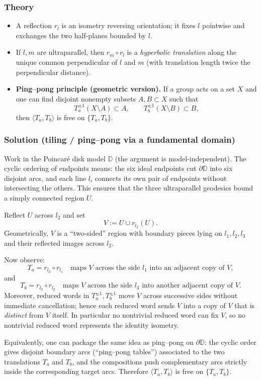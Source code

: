 \documentclass[12pt,a4paper]{article}
\newcommand{\DD}{\mathbb{D}}
\theoremstyle{plain}
\theoremstyle{definition}      %
\begin{document}
\subsubsection*{Theory}
\begin{itemize}
	\item A reflection $r_l$ is an isometry reversing orientation; it fixes $l$ pointwise and exchanges the two half-planes bounded by $l$.
	\item If $l,m$ are ultraparallel, then $r_m\circ r_l$ is a \emph{hyperbolic translation} along the unique common perpendicular of $l$ and $m$
	(with translation length twice the perpendicular distance).
	\item \textbf{Ping--pong principle (geometric version).}
	If a group acts on a set $X$ and one can find disjoint nonempty subsets $A,B\subset X$ such that
	\[
	T_a^{\pm1}(X\setminus A)\subset A,
	\qquad
	T_b^{\pm1}(X\setminus B)\subset B,
	\]
	then $\langle T_a,T_b\rangle$ is free on $\{T_a,T_b\}$.
\end{itemize}

\subsubsection*{Solution (tiling / ping--pong via a fundamental domain)}
Work in the Poincar\'e disk model $\DD$ (the argument is model-independent).
The cyclic ordering of endpoints means: the six ideal endpoints cut $\partial\DD$ into six disjoint arcs, and each line $l_i$
connects its own pair of endpoints without intersecting the others. This ensures that the three ultraparallel geodesics bound a
simply connected region $U$.

Reflect $U$ across $l_2$ and set
\[
V:=U\cup r_{l_2}(U).
\]
Geometrically, $V$ is a ``two-sided'' region with boundary pieces lying on $l_1,l_2,l_3$ and their reflected images across $l_2$.

Now observe:
\[
T_a=r_{l_2}\circ r_{l_1}\quad\text{maps $V$ across the side $l_1$ into an adjacent copy of $V$},
\]
and
\[
T_b=r_{l_3}\circ r_{l_2}\quad\text{maps $V$ across the side $l_3$ into another adjacent copy of $V$}.
\]
Moreover, reduced words in $T_a^{\pm1},T_b^{\pm1}$ move $V$ across successive sides without immediate cancellation; hence each reduced word
sends $V$ into a copy of $V$ that is \emph{distinct} from $V$ itself. In particular no nontrivial reduced word can fix $V$, so
no nontrivial reduced word represents the identity isometry.

Equivalently, one can package the same idea as ping--pong on $\partial\DD$:
the cyclic order gives disjoint boundary arcs (``ping--pong tables'') associated to the two translations $T_a$ and $T_b$,
and the compositions push complementary arcs strictly inside the corresponding target arcs.
Therefore $\langle T_a,T_b\rangle$ is free on $\{T_a,T_b\}$.
\end{document}
